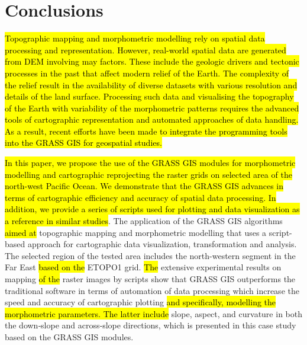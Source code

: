 \documentclass[technologies,article,submit,pdftex,moreauthors]{Definitions/mdpi}
\begin{document}
\section{Conclusions}

\hl{Topographic mapping and morphometric modelling rely on spatial data processing and representation. However, real-world spatial data are generated from DEM involving may factors. These include the geologic drivers and tectonic processes in the past that affect modern relief of  the Earth. The complexity of the relief result in the availability of diverse datasets with various resolution and details of the land surface. Processing such data and visualising the topography of the Earth with variability of the morphometric patterns requires the advanced tools of cartographic representation and automated approaches of data handling. As a result, recent efforts have been made to integrate the programming tools into the GRASS GIS for geospatial studies.} 

\hl{In this paper, we propose the use of the GRASS GIS modules for morphometric modelling and cartographic reprojecting the raster grids on selected area of the north-west Pacific Ocean. We demonstrate that the GRASS GIS advances in terms of cartographic efficiency and accuracy of spatial data processing. In addition, we provide a series of scripts used for plotting and data visualization as a reference in similar studies}. The application of the GRASS GIS algorithms \hl{aimed at }topographic mapping and morphometric modelling that uses a script-based approach for cartographic data visualization, transformation and analysis. The selected region of the tested area includes the north-western segment\hl{ }in the Far East \hl{based on the} ETOPO1 grid. \hl{The }extensive experimental results on mapping \hl{of the }raster images by scripts\hl{ }show that GRASS GIS outperforms the traditional software in terms of automation of data processing which increase the speed and accuracy of cartographic plotting\hl{ and specifically, modelling the morphometric parameters. The latter include} slope, aspect, and curvature in both the down‐slope and across‐slope directions, which is presented in this case study based on the GRASS GIS modules. 
\end{document}
